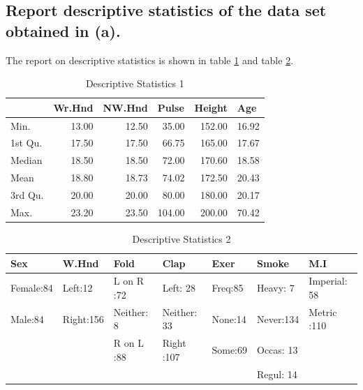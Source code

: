 \documentclass{zjureport}
\begin{document}
\subsection{Report descriptive statistics of the data set obtained in (a).}
The report on descriptive statistics is shown in table \ref{tab1} and table \ref{tab2}.
\begin{table}[htbp]
	\centering
	\caption{Descriptive Statistics 1}
	\begin{tabular}{lrrrrr}
		\toprule[1.5pt]
		& \multicolumn{1}{l}{Wr.Hnd} & \multicolumn{1}{l}{NW.Hnd} & \multicolumn{1}{l}{Pulse} & \multicolumn{1}{l}{Height} & \multicolumn{1}{l}{Age} \\
		\toprule[1.5pt]
		Min.  & 13.00 & 12.50 & 35.00 & 152.00 & 16.92 \\
		1st Qu. & 17.50 & 17.50 & 66.75 & 165.00 & 17.67 \\
		Median & 18.50 & 18.50 & 72.00 & 170.60 & 18.58 \\
		Mean  & 18.80 & 18.73 & 74.02 & 172.50 & 20.43 \\
		3rd Qu. & 20.00 & 20.00 & 80.00 & 180.00 & 20.17 \\
		Max.  & 23.20 & 23.50 & 104.00 & 200.00 & 70.42 \\
		\toprule[1.5pt]
	\end{tabular}%
	\label{tab1}%
\end{table}%

\begin{table}[htbp]
	\centering
	\caption{Descriptive Statistics 2}
	\begin{tabular}{rrrrrlr}
		\toprule[1.5pt]
		\multicolumn{1}{l}{Sex} & \multicolumn{1}{l}{W.Hnd} & \multicolumn{1}{l}{Fold} & \multicolumn{1}{l}{Clap} & \multicolumn{1}{l}{Exer} & Smoke & \multicolumn{1}{l}{M.I} \\
		\toprule[1.5pt]
		\multicolumn{1}{l}{Female:84} & \multicolumn{1}{l}{Left:12} & \multicolumn{1}{l}{L on R :72} & \multicolumn{1}{l}{Left: 28} & \multicolumn{1}{l}{Freq:85} & Heavy:  7 & \multicolumn{1}{l}{Imperial: 58} \\
		\multicolumn{1}{l}{Male:84} & \multicolumn{1}{l}{Right:156} & \multicolumn{1}{l}{Neither: 8} & \multicolumn{1}{l}{Neither: 33} & \multicolumn{1}{l}{None:14} & Never:134 & \multicolumn{1}{l}{Metric  :110} \\
		&       & \multicolumn{1}{l}{R on L :88} & \multicolumn{1}{l}{Right  :107} & \multicolumn{1}{l}{Some:69} & Occas: 13 &  \\
		&       &       &       &       & Regul: 14 &  \\
		\toprule[1.5pt]
	\end{tabular}%
	\label{tab2}%
\end{table}%
\end{document}
